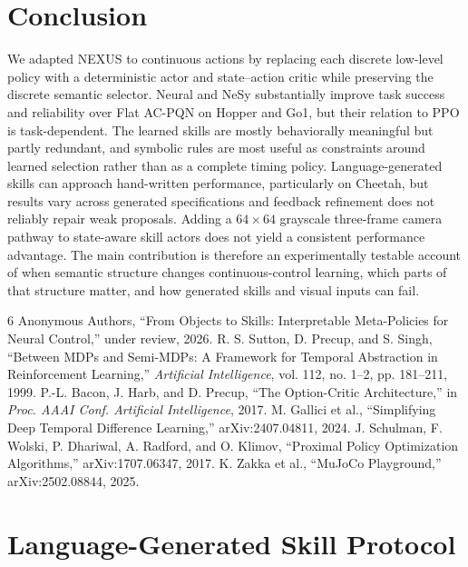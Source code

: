 \documentclass[conference,letterpaper,10pt]{IEEEtran}
\begin{document}
\section{Conclusion}
We adapted NEXUS to continuous actions by replacing each discrete low-level policy with a deterministic actor and state--action critic while preserving the discrete semantic selector. Neural and NeSy substantially improve task success and reliability over Flat AC-PQN on Hopper and Go1, but their relation to PPO is task-dependent. The learned skills are mostly behaviorally meaningful but partly redundant, and symbolic rules are most useful as constraints around learned selection rather than as a complete timing policy. Language-generated skills can approach hand-written performance, particularly on Cheetah, but results vary across generated specifications and feedback refinement does not reliably repair weak proposals. Adding a $64\times64$ grayscale three-frame camera pathway to state-aware skill actors does not yield a consistent performance advantage. The main contribution is therefore an experimentally testable account of when semantic structure changes continuous-control learning, which parts of that structure matter, and how generated skills and visual inputs can fail.

\begin{thebibliography}{6}
 Anonymous Authors, ``From Objects to Skills: Interpretable Meta-Policies for Neural Control,'' under review, 2026.
 R. S. Sutton, D. Precup, and S. Singh, ``Between MDPs and Semi-MDPs: A Framework for Temporal Abstraction in Reinforcement Learning,'' \emph{Artificial Intelligence}, vol. 112, no. 1--2, pp. 181--211, 1999.
 P.-L. Bacon, J. Harb, and D. Precup, ``The Option-Critic Architecture,'' in \emph{Proc. AAAI Conf. Artificial Intelligence}, 2017.
 M. Gallici et al., ``Simplifying Deep Temporal Difference Learning,'' arXiv:2407.04811, 2024.
 J. Schulman, F. Wolski, P. Dhariwal, A. Radford, and O. Klimov, ``Proximal Policy Optimization Algorithms,'' arXiv:1707.06347, 2017.
 K. Zakka et al., ``MuJoCo Playground,'' arXiv:2502.08844, 2025.
\end{thebibliography}


\clearpage
\appendices

\section{Language-Generated Skill Protocol}
\label{app:llm}
\end{document}

